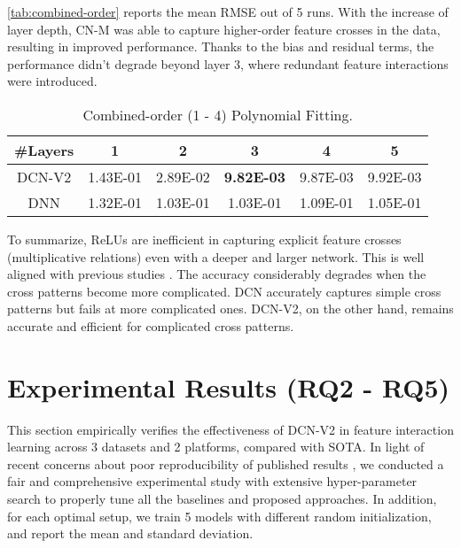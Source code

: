 \documentclass[sigconf]{acmart}
\begin{document}
\autoref{tab:combined-order} reports the mean RMSE out of 5 runs. With the increase of layer depth, CN-M was able to capture higher-order feature crosses in the data, resulting in improved performance. Thanks to the bias and residual terms, the performance didn't degrade beyond layer 3, where redundant feature interactions were introduced. 

\begin{table}[htbp]
\small
\caption{Combined-order (1 - 4) Polynomial Fitting.}
\vspace{-3.ex}
\label{tab:combined-order}
    \begin{subtable}[h]{0.45\textwidth}
        \centering
\begin{tabular}{c|ccccc}
\toprule
{\bf \#Layers} & 1 & 2 & 3 & 4 & 5\\
\midrule
{DCN-V2} & 1.43E-01 & 2.89E-02 & \bf 9.82E-03 & 9.87E-03 & 9.92E-03 \\
DNN& 1.32E-01 & 1.03E-01 & 1.03E-01 &  1.09E-01 & 1.05E-01\\
\bottomrule
\end{tabular}
\end{subtable}
\end{table}

To summarize, ReLUs are inefficient in capturing explicit feature crosses (multiplicative relations) even with a deeper and larger network. This is well aligned with previous studies \cite{beutel2018latent}. The accuracy considerably degrades when the cross patterns become more complicated. DCN accurately captures simple cross patterns but fails at more complicated ones. {DCN-V2}, on the other hand, remains accurate and efficient for complicated cross patterns.

\section{Experimental Results (RQ2 - RQ5)}
\label{sec:exp_public}
This section empirically verifies the effectiveness of {DCN-V2} in feature interaction learning across 3 datasets and 2 platforms, compared with SOTA. In light of recent concerns about poor reproducibility of published results \cite{dacrema2019we, musgrave2020metric, rendle2020neural}, we conducted a fair and comprehensive experimental study with extensive hyper-parameter search to properly tune all the baselines and proposed approaches. In addition, for each optimal setup, we train 5 models with different random initialization, and report the mean and standard deviation. 
\end{document}
